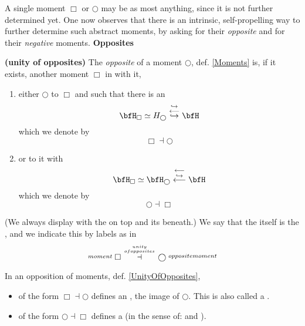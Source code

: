 A single moment $\Box$ or $\bigcirc$ may be  as most anything, since it is not further determined yet. One now observes that there is an intrinsic, self-propelling way to further determine such abstract moments, by asking for their \emph{opposite} and for their \emph{negative} moments.
\textbf{Opposites}
\begin{defn}
\label{UnityOfOpposites}\hypertarget{UnityOfOpposites}{}
\textbf{(unity of opposites)}
The \emph{opposite} of a moment $\bigcirc$, def. \ref{Moments} is, if it exists, another moment $\Box$ in  with it,
\begin{enumerate}%
\item either $\bigcirc$  to $\Box$ and such that there is an 
\begin{displaymath}
\bfH_{\Box}\simeq H_{\bigcirc}
\stackrel{\hookrightarrow}{\stackrel{\longleftarrow}{\hookrightarrow}}
\bfH
\end{displaymath}
which we denote by
\begin{displaymath}
\Box \dashv \bigcirc
\end{displaymath}
\item or  to it with
\begin{displaymath}
\bfH_{\Box}\simeq \bfH_{\bigcirc}
\stackrel{\longleftarrow}{\stackrel{\hookrightarrow}{\longleftarrow}}
\bfH
\end{displaymath}
which we denote by
\begin{displaymath}
\bigcirc \dashv \Box
\end{displaymath}
\end{enumerate}
(We always display  with the  on top and its  beneath.)
We say that the  itself is the , and we indicate this by labels as in
\begin{displaymath}
\stackrel{moment}{} \Box \stackrel{unity \atop {ofopposites}}{\dashv} \bigcirc \stackrel{oppositemoment}{}
\end{displaymath}
\end{defn}
\begin{remark}
\label{}\hypertarget{}{}
In  an opposition of moments, def. \ref{UnityOfOpposites},
\begin{itemize}%
\item of the form $\Box \dashv \bigcirc$ defines an  , the image of $\bigcirc$. This is also called a .
\item of the form $\bigcirc \dashv \Box$ defines a  (in the sense of:  and ).
\end{itemize}
\end{remark}
